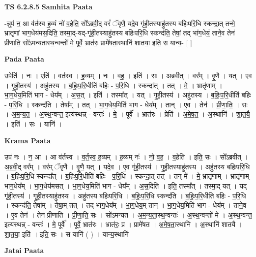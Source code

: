 \documentclass[17pt]{extarticle}
\begin{document}
\textbf{TS 6.2.8.5 } \newline
\textbf{Samhita Paata} \newline

-न्नुप॑ न॒ आ व॑र्तस्व ह॒व्यं नो॑ व॒हेति॒ सो᳚ऽब्रवी॒द् वरं॑ ॅवृणै॒ यदे॒व गृ॑ही॒तस्याहु॑तस्य बहिःपरि॒धि स्कन्दा॒त् तन्मे॒ भ्रातृ॑णां भाग॒धेय॑मस॒दिति॒ तस्मा॒द्-यद्-गृ॑ही॒तस्याहु॑तस्य बहिःपरि॒धि स्कन्द॑ति॒ तेषां॒ तद् भा॑ग॒धेयं॒ ताने॒व तेन॑ प्रीणाति॒ सो॑ऽमन्यतास्थ॒न्वन्तो॑ मे॒ पूर्वे॒ भ्रात॑रः॒ प्रामे॑षता॒स्थानि॑ शातया॒ इति॒ स यान्य॒- [  ] \newline

\textbf{Pada Paata} \newline

उपेति॑ । नः॒ । एति॑ । व॒र्त॒स्व॒ । ह॒व्यम् । नः॒ । व॒ह॒ । इति॑ । सः । अ॒ब्र॒वी॒त् । वर᳚म् । वृ॒णै॒ । यत् । ए॒व । गृ॒ही॒तस्य॑ । अहु॑तस्य । ब॒हिः॒प॒रि॒धीति॑ बहिः - प॒रि॒धि । स्कन्दा᳚त् । तत् । मे॒ । भ्रातृ॑णाम् । भा॒ग॒धेय॒मिति॑ भाग - धेय᳚म् । अ॒स॒त् । इति॑ । तस्मा᳚त् । यत् । गृ॒ही॒तस्य॑ । अहु॑तस्य । ब॒हिः॒प॒रि॒धीति॑ बहिः - प॒रि॒धि । स्कन्द॑ति । तेषा᳚म् । तत् । भा॒ग॒धेय॒मिति॑ भाग - धेय᳚म् । तान् । ए॒व । तेन॑ । प्री॒णा॒ति॒ । सः । अ॒म॒न्य॒त॒ । अ॒स्थ॒न्वन्त॒ इत्य॑स्थन्न् - वन्तः॑ । मे॒ । पूर्वे᳚ । भ्रात॑रः । प्रेति॑ । अ॒मे॒ष॒त॒ । अ॒स्थानि॑ । शा॒त॒यै॒ । इति॑ । सः । यानि॑ ।  \newline


\textbf{Krama Paata} \newline

उप॑ नः । न॒ आ । आ व॑र्तस्व । व॒र्त॒स्व॒ ह॒व्यम् । ह॒व्यम् नः॑ । नो॒ व॒ह॒ । व॒हेति॑ । इति॒ सः । सो᳚ऽब्रवीत् । अ॒ब्र॒वी॒द् वर᳚म् । वर॑म् ॅवृणै । वृ॒णै॒ यत् । यदे॒व । ए॒व गृ॑ही॒तस्य॑ । गृ॒ही॒तस्याहु॑तस्य । अहु॑तस्य बहिःपरि॒धि । ब॒हिः॒प॒रि॒धि स्कन्दा᳚त् । ब॒हिः॒प॒रि॒धीति॑ बहिः - प॒रि॒धि । स्कन्दा॒त् तत् । तन् मे᳚ । मे॒ भ्रातृ॑णाम् । भ्रातृ॑णाम् भाग॒धेय᳚म् । भा॒ग॒धेय॑मसत् । भा॒ग॒धेय॒मिति॑ भाग - धेय᳚म् । अ॒स॒दिति॑ । इति॒ तस्मा᳚त् । तस्मा॒द् यत् । यद् गृ॑ही॒तस्य॑ । गृ॒ही॒तस्याहु॑तस्य । अहु॑तस्य बहिःपरि॒धि । ब॒हिः॒प॒रि॒धि स्कन्द॑ति । ब॒हिः॒प॒रि॒धीति॑ बहिः - प॒रि॒धि । स्कन्द॑ति॒ तेषा᳚म् । तेषा॒म् तत् । तद् भा॑ग॒धेय᳚म् । भा॒ग॒धेय॒म् तान् । भा॒ग॒धेय॒मिति॑ भाग - धेय᳚म् । ताने॒व । ए॒व तेन॑ । तेन॑ प्रीणाति । प्री॒णा॒ति॒ सः । सो॑ऽमन्यत । अ॒म॒न्य॒ता॒स्थ॒न्वन्तः॑ । अ॒स्थ॒न्वन्तो॑ मे । अ॒स्थ॒न्वन्त॒ इत्य॑स्थन्न् - वन्तः॑ । मे॒ पूर्वे᳚ । पूर्वे॒ भ्रात॑रः । भ्रात॑रः॒ प्र । प्रामे॑षत । अ॒मे॒ष॒ता॒स्थानि॑ । अ॒स्थानि॑ शातयै । शा॒त॒या॒ इति॑ । इति॒ सः । स यानि॑ ( ) । यान्य॒स्थानि॑ \newline

\textbf{Jatai Paata} \newline
\end{document}
